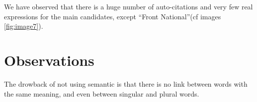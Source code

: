 \documentclass[a4paper]{article}
\theoremstyle{definition}
\begin{document}
We have observed that there is a huge number of auto-citations and very few real expressions for the main candidates, except ``Front National''(cf images \ref{fig:image7}).

\newpage
\section{Observations}
The drowback of not using semantic is that there is no link between words with the same meaning, and even between singular and plural words.
\end{document}
